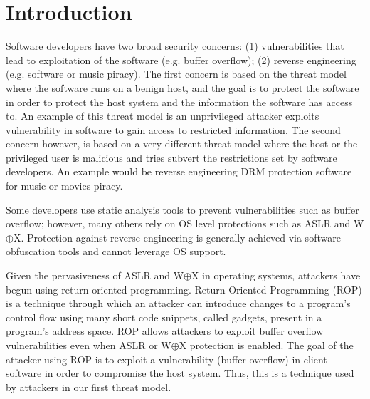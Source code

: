 \section{Introduction}
\label{sec:introduction}

Software developers have two broad security concerns: (1) vulnerabilities that 
lead to exploitation of the software (e.g. buffer overflow); (2) reverse 
engineering (e.g. software or music piracy). The first concern is based on the 
threat model where the software runs on a benign host, and the goal is to 
protect the software in order to protect the host system and the information 
the software has access to. An example of this threat model is an unprivileged 
attacker exploits vulnerability in software to gain access to restricted 
information. The second concern however, is based on a very different threat 
model where the host or the privileged user is malicious and tries subvert the 
restrictions set by software developers. An example would be reverse 
engineering DRM protection software for music or movies piracy. 

Some developers use static analysis tools to prevent vulnerabilities such as 
buffer overflow; however, many others rely on OS level protections such as 
ASLR and W$\oplus$X. Protection against reverse engineering is generally 
achieved via software obfuscation tools and cannot leverage OS support. 

Given the pervasiveness of ASLR and W$\oplus$X in operating systems, attackers 
have begun using return oriented programming. Return Oriented Programming 
(ROP) is a technique through which an attacker can introduce changes to a 
program's control flow using many short code snippets,  
called gadgets, present in a program's address space. ROP allows attackers to  
exploit buffer overflow vulnerabilities even when ASLR or W$\oplus$X 
protection is enabled. The goal of the attacker using ROP is to exploit a 
vulnerability (buffer overflow) in client software in order to compromise the 
host system. Thus, this is a technique used by attackers in our first threat 
model. 

